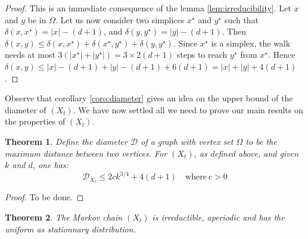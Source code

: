 \documentclass[11pt]{article}
\newtheorem{theorem}{Theorem}
\begin{document}
\begin{proof}
  This is an immediate consequence of the lemma \ref{lem:irreducibility}. Let $x$ and $y$ be in $\Omega$. Let us now consider two simplices $x^\star$ and $y^\star$ such that $\delta(x,x^\star) = |x| - (d+1)$, and $\delta(y,y^\star) = |y| - (d+1)$. Then $\delta(x,y) \leq{\delta(x,x^\star) + \delta(x^\star,y^\star) + \delta(y,y^\star)}$.
  Since $x^\star$ is a simplex, the walk needs at most $3(|x^\star| + |y^\star|) = 3 \times 2(d+1)$ steps to reach $y^\star$ from $x^\star$. Hence $  \delta(x,y) \leq{|x| - (d+1) + |y| - (d+1) + 6(d+1)} = |x| + |y| + 4(d+1)$.
\end{proof}

Observe that corollary \ref{coro:diameter} gives an idea on the upper bound of the diameter of $(X_t)$. We have now settled all we need to prove our main results on the properties of $(X_t)$.

\begin{theorem}\label{thm:diameter}
  Define the diameter $\mathcal{D}$ of a graph with vertex set $\Omega$ to be the maximum distance between two vertices. For $(X_t)$, as defined above, and given $k$ and $d$, one has:
  \begin{equation}
    \mathcal{D}_{X_t} \leq{2ck^{3/4} + 4(d+1)} \quad \mbox{where} \ c>0
  \end{equation}
\end{theorem}

\begin{proof}
  To be done.
\end{proof}

\begin{theorem}\label{thm:main}
  The Markov chain $(X_t)$ is irreductible, aperiodic and has the uniform as stationnary distribution.
\end{theorem}
\end{document}
